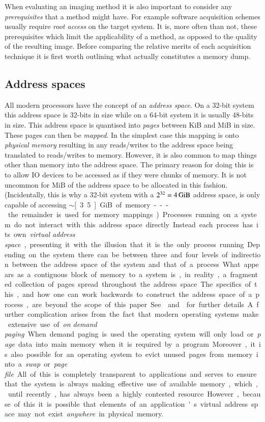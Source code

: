 \documentclass[numbers=noenddot,      %
               abstract,              %
               captions=tableheading, %
               DIV=8]                 %
              {scrartcl}
\begin{document}
When evaluating an imaging method it is also important to consider any
\emph{prerequisites} that a method might have. For example software
acquisition schemes usually require \emph{root access} on the target
system. It is, more often than not, these prerequisites which limit the
applicability of a method, as opposed to the quality of the resulting
image. Before comparing the relative merits of each acquisition
technique it is first worth outlining what actually constitutes a memory
dump.

\subsection{Address spaces}
\label{sec:addrspace}

All modern processors have the concept of an \emph{address space}. On a
32-bit system this address space is 32-bits in size while on a 64-bit
system it is usually 48-bits in size. This address space is quantised
into \emph{pages} between \unit[4]{KiB} and \unit[4]{MiB} in size. These
pages can then be \emph{mapped}. In the simplest case this mapping is
onto \emph{physical memory} resulting in any reads/writes to the address
space being translated to reads/writes to memory. However, it is also
common to map things other than memory into the address space. The
primary reason for doing this is to allow IO devices to be accessed as
if they were chunks of memory. It is not uncommon for \unit[500]{MiB} of
the address space to be allocated in this fashion. (Incidentally, this
is why a 32-bit system with a $2^{32}=\unit[4]{GiB}$ address space, is
only capable of accessing $\sim$\unit[3.5]{GiB} of memory---the
remainder is used for memory mappings.)

Processes running on a system do not interact with this address space
directly. Instead each process has its own \emph{virtual address space},
presenting it with the illusion that it is the only process
running. Depending on the system there can be between three and four
levels of indirection between the address space of the system and that
of a process. What appears as a contiguous block of memory to a system
is, in reality, a fragmented collection of pages spread throughout the
address space. The specifics of this, and how one can work backwards to
construct the address space of a process, are beyond the scope of this
paper. See \cite{schuster09} and \cite{suiche10} for further details. A
further complication arises from the fact that modern operating systems
make extensive use of \emph{on demand paging}. When demand paging is
used the operating system will only load or \emph{page} data into main
memory when it is required by a program. Moreover, it is also possible
for an operating system to evict unused pages from memory into a
\emph{swap} or \emph{page file}. All of this is completely transparent
to applications and serves to ensure that the system is always making
effective use of available memory, which, until recently, has always
been a highly contested resource. However, because of this it is
possible that elements of an application's virtual address space may not
exist \emph{anywhere} in physical memory.
\end{document}
